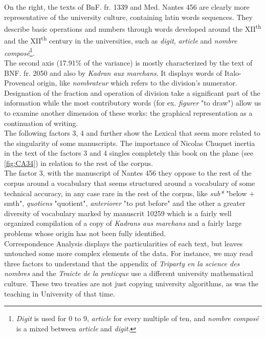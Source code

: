 \documentclass[preprint]{elsarticle}
\begin{document}
On the right, the texts of BnF. fr. 1339 and Med. Nantes 456 are clearly more representative of the university culture, containing latin words sequences. They describe basic operations and numbers through words developed around the XII\textsuperscript{th} and the XII\textsuperscript{th} century in the universities, such as \textit{digit}, \textit{article} and \textit{nombre compos\'e}\footnote{\textit{Digit} is used for 0 to 9, \textit{article} for every multiple of ten, and \textit{nombre compos\'e} is a mixed between \textit{article} and \textit{digit}.}.\\

The second axis (17.91\% of the variance) is mostly characterized by the text of BNF. fr. 2050 and also by \textit{Kadran aux marchans}. It displays words of Italo-Provencal origin, like \textit{nombrateur} which refers to the division's numerator. Designation of the fraction and operation of division take a significant part of the information while the most contributory words (for ex. \textit{figurer} "to draw") allow us to examine another dimension of these works: the graphical representation as a continuation of writing.\\

The following factors 3, 4 and further show the Lexical that seem more related to the singularity of some manuscripts. The importance of Nicolas Chuquet inertia in the text of the factors 3 and 4 singles completely this book on the plane (see \ref{fig:CA34}) in relation to the rest of the corpus.\\

The factor 3, with the manuscript of Nantes 456 they oppose to the rest of the corpus around a vocabulary that seems structured around a vocabulary of some technical accuracy, in any case rare in the rest of the corpus, like \textit{sub*} "below + smth", \textit{quotiens} "quotient", \textit{anteriorer} "to put before" and the other a greater diversity of vocabulary marked by manuscrit 10259 which is a fairly well organized compilation of a copy of \textit{Kadrans aus marchans} and a fairly large problems whose origin has not been fully identified.\\

Correspondence Analysis displays the particularities of each text, but leaves untouched some more complex elements of the data. For instance, we may read three factors to understand that the appendix of \textit{Triparty en la science des nombres} and the \textit{Traicte de la praticque} use a different university mathematical culture. These two treaties are not just copying university algorithms, as was the teaching in University of that time.\\
\end{document}
